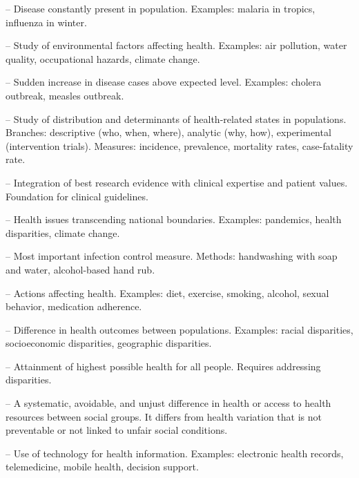 -- Disease constantly present in population. Examples: malaria in tropics, influenza in winter.


-- Study of environmental factors affecting health. Examples: air pollution, water quality, occupational hazards, climate change.




-- Sudden increase in disease cases above expected level. Examples: cholera outbreak, measles outbreak.

-- Study of distribution and determinants of health-related states in populations. Branches: descriptive (who, when, where), analytic (why, how), experimental (intervention trials). Measures: incidence, prevalence, mortality rates, case-fatality rate.

-- Integration of best research evidence with clinical expertise and patient values. Foundation for clinical guidelines.



-- Health issues transcending national boundaries. Examples: pandemics, health disparities, climate change.




-- Most important infection control measure. Methods: handwashing with soap and water, alcohol-based hand rub.


-- Actions affecting health. Examples: diet, exercise, smoking, alcohol, sexual behavior, medication adherence.



-- Difference in health outcomes between populations. Examples: racial disparities, socioeconomic disparities, geographic disparities.


-- Attainment of highest possible health for all people. Requires addressing disparities.



-- A systematic, avoidable, and unjust difference in health or access to health resources between social groups. It differs from health variation that is not preventable or not linked to unfair social conditions.


-- Use of technology for health information. Examples: electronic health records, telemedicine, mobile health, decision support.


